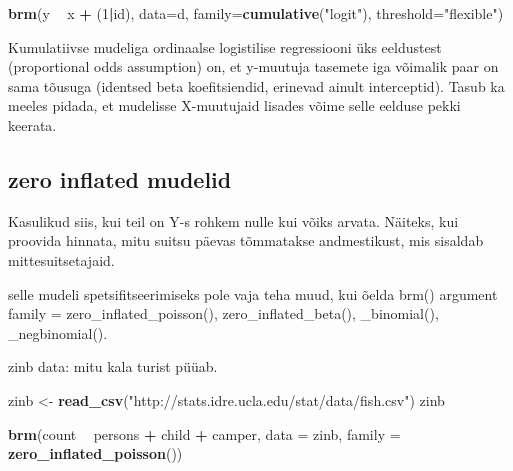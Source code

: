 \documentclass[]{book}
\newenvironment{Shaded}{\begin{snugshade}}{\end{snugshade}}
\newcommand{\KeywordTok}[1]{\textcolor[rgb]{0.13,0.29,0.53}{\textbf{#1}}}
\newcommand{\DataTypeTok}[1]{\textcolor[rgb]{0.13,0.29,0.53}{#1}}
\newcommand{\DecValTok}[1]{\textcolor[rgb]{0.00,0.00,0.81}{#1}}
\newcommand{\StringTok}[1]{\textcolor[rgb]{0.31,0.60,0.02}{#1}}
\newcommand{\OperatorTok}[1]{\textcolor[rgb]{0.81,0.36,0.00}{\textbf{#1}}}
\newcommand{\NormalTok}[1]{#1}
\begin{document}
\begin{Shaded}
\begin{Highlighting}[]
\KeywordTok{brm}\NormalTok{(y }\OperatorTok{~}\StringTok{ }\NormalTok{x }\OperatorTok{+}\StringTok{ }\NormalTok{(}\DecValTok{1}\OperatorTok{|}\NormalTok{id), }
    \DataTypeTok{data=}\NormalTok{d, }
    \DataTypeTok{family=}\KeywordTok{cumulative}\NormalTok{(}\StringTok{"logit"}\NormalTok{), }
    \DataTypeTok{threshold=}\StringTok{"flexible"}\NormalTok{)}
\end{Highlighting}
\end{Shaded}

Kumulatiivse mudeliga ordinaalse logistilise regressiooni üks eeldustest
(proportional odds assumption) on, et y-muutuja tasemete iga võimalik
paar on sama tõusuga (identsed beta koefitsiendid, erinevad ainult
interceptid). Tasub ka meeles pidada, et mudelisse X-muutujaid lisades
võime selle eelduse pekki keerata.

\subsection{zero inflated mudelid}\label{zero-inflated-mudelid}

Kasulikud siis, kui teil on Y-s rohkem nulle kui võiks arvata. Näiteks,
kui proovida hinnata, mitu suitsu päevas tõmmatakse andmestikust, mis
sisaldab mittesuitsetajaid.

selle mudeli spetsifitseerimiseks pole vaja teha muud, kui õelda brm()
argument family = zero\_inflated\_poisson(), zero\_inflated\_beta(),
\_binomial(), \_negbinomial().

zinb data: mitu kala turist püüab.

\begin{Shaded}
\begin{Highlighting}[]
\NormalTok{zinb <-}\StringTok{ }\KeywordTok{read_csv}\NormalTok{(}\StringTok{"http://stats.idre.ucla.edu/stat/data/fish.csv"}\NormalTok{)}
\NormalTok{zinb}
\end{Highlighting}
\end{Shaded}

\begin{Shaded}
\begin{Highlighting}[]
\KeywordTok{brm}\NormalTok{(count }\OperatorTok{~}\StringTok{ }\NormalTok{persons }\OperatorTok{+}\StringTok{ }\NormalTok{child }\OperatorTok{+}\StringTok{ }\NormalTok{camper, }
                 \DataTypeTok{data =}\NormalTok{ zinb, }\DataTypeTok{family =} \KeywordTok{zero_inflated_poisson}\NormalTok{())}
\end{Highlighting}
\end{Shaded}
\end{document}

